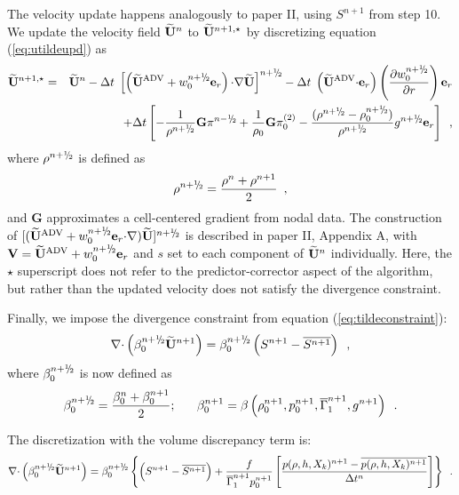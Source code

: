 \begin{description}
The velocity update happens analogously to paper II, using $S^{n+1}$ from step 10.
We update the velocity field $\widetilde{{\bf U}}^n$ to $\widetilde{{\bf U}}^{n+1,\star}$ by discretizing 
equation (\ref{eq:utildeupd}) as
\begin{eqnarray}
\Ubt^{n+1,\star} &=& \Ubt^n - \dt \;
 \left[\left(\uadvtwo+ w_0^{\nph} \er\right) \cdotb \nablab \Ubt \right]^\nph
      - \dt \; \left(\uadvtwo \cdotb \er\right)  \left(\frac{\partial w_0^{\nph}}{\partial r} \right) \er \nonumber \\
   &&   + \dt \left[ - \frac{1}{\rho^\nph} {\mathbf{G}} \pi^\nmh
        + \frac{1}{\rho_0} {\mathbf{G}} \pizerotwo
        - \frac{(\rho^\nph-\rhozero^\nph)}{\rho^\nph} g^{n+\myhalf} \er \right] \enskip ,
\end{eqnarray}
where $\rho^{\nph}$ is defined as
\begin{equation}
\rho^\nph = \frac{\rho^n + \rho^{n+1}}{2}\enskip ,
\end{equation}
and $\mathbf{G}$ approximates a cell-centered gradient from nodal data.
The construction of $[(\uadvtwo+ w_0^{\nph} \er \cdotb \nablab) \Ubt ]^\nph$
is described in paper II, Appendix A, with $\Vb = \uadvtwo+w_0^{\nph} \er$ and $s$ 
set to each component of $\widetilde{{\bf U}}^n$ individually.  Here, the $\star$ superscript 
does not refer to the predictor-corrector aspect of the algorithm, but rather 
than the updated velocity does not satisfy the divergence constraint.

Finally, we impose the divergence constraint from equation (\ref{eq:tildeconstraint}):
\begin{equation}
\nablab \cdotb \left(\beta_0^{\nph} \Ubt^{n+1} \right) 
= \beta_0^{\nph} \left(S^{n+1} - \overline{S^{n+1}} \right) \enskip,
\end{equation}
where $\beta_0^{n+\myhalf}$ is now defined as
\begin{equation}
\beta_0^{n+\myhalf} = \frac{\beta_0^n + \beta_0^{n+1}}{2}; ~~~~~ 
\beta_0^{n+1} = \beta \left(\rho_0^{n+1}, p_0^{n+1}, \gammabar^{n+1}, g^{n+1}\right)\enskip .
\end{equation}

The discretization with the volume discrepancy term is:
\begin{equation}
\nablab \cdotb \left(\beta_0^{\nph} \Ubt^{n+1} \right)  = \beta_0^{\nph}\left\{  \left(S^{n+1} - \overline{S^{n+1}} \right)
+ \frac{f}{\gammabar^{n+1} p_0^{n+1}}
\left[\frac{p(\rho,h,X_k)^{n+1} - \overline{p(\rho,h,X_k)^{n+1}}}{\Delta t^n}\right]\right\}
\enskip .
\end{equation}


\end{description}
